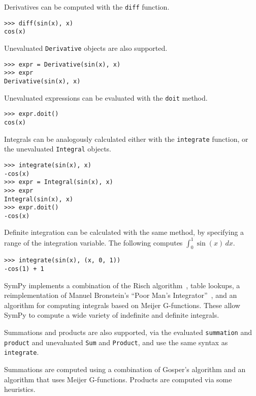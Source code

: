 

Derivatives can be computed with the \verb|diff| function.

\begin{verbatim}
>>> diff(sin(x), x)
cos(x)
\end{verbatim}

Unevaluated \verb|Derivative| objects are also supported.

\begin{verbatim}
>>> expr = Derivative(sin(x), x)
>>> expr
Derivative(sin(x), x)
\end{verbatim}

Unevaluated expressions can be evaluated with the \verb|doit| method.

\begin{verbatim}
>>> expr.doit()
cos(x)
\end{verbatim}

Integrals can be analogously calculated either with the \verb|integrate|
function, or the unevaluated \verb|Integral| objects.
\begin{verbatim}
>>> integrate(sin(x), x)
-cos(x)
>>> expr = Integral(sin(x), x)
>>> expr
Integral(sin(x), x)
>>> expr.doit()
-cos(x)
\end{verbatim}
Definite integration can be calculated with the same method, by specifying a
range of the integration variable. The following computes $\int_0^1\sin(x)\,dx$.
\begin{verbatim}
>>> integrate(sin(x), (x, 0, 1))
-cos(1) + 1
\end{verbatim}

SymPy implements a combination of the Risch
algorithm~\cite{bronstein2005integration}, table lookups, a reimplementation
of Manuel Bronstein's ``Poor Man's Integrator''~\cite{Bronstein2005pmint}, and
an algorithm for computing integrals based on Meijer G-functions. These allow
SymPy to compute a wide variety of indefinite and definite integrals.

Summations and products are also supported, via the evaluated \verb|summation|
and \verb|product| and unevaluated \verb|Sum| and \verb|Product|, and use the
same syntax as \verb|integrate|.

Summations are computed using a combination of Gosper's algorithm and an
algorithm that uses Meijer G-functions. Products are computed via some
heuristics.

